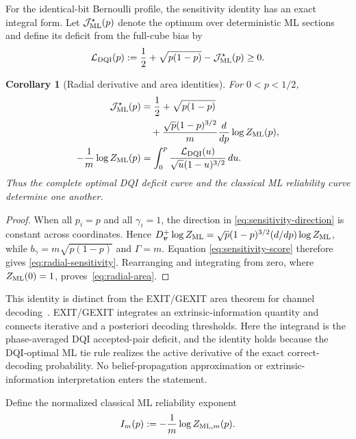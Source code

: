 \documentclass[journal]{IEEEtran}
\newtheorem{corollary}[theorem]{Corollary}
\theoremstyle{definition}
\theoremstyle{remark}
\begin{document}
For the identical-bit Bernoulli profile, the sensitivity identity has an
exact integral form.  Let $\mathcal J_{\rm ML}^{\star}(p)$ denote the optimum
over deterministic ML sections and define its deficit from the full-cube
bias by
\begin{equation}
 \mathcal L_{\rm DQI}(p)
 :=\frac12+\sqrt{p(1-p)}-\mathcal J_{\rm ML}^{\star}(p)\ge0.
 \label{eq:dqi-deficit}
\end{equation}

\begin{corollary}[Radial derivative and area identities]
\label{cor:radial-sensitivity}
For $0<p<1/2$,
\begin{align}
 \mathcal J_{\rm ML}^{\star}(p)
 &=\frac12+\sqrt{p(1-p)}
 \nonumber\\
 &\quad
 +\frac{\sqrt p(1-p)^{3/2}}{m}
   \frac{d}{dp}\log Z_{\rm ML}(p),
 \label{eq:radial-sensitivity}\\
 -\frac1m\log Z_{\rm ML}(p)
 &=\int_0^p
 \frac{\mathcal L_{\rm DQI}(u)}
 {\sqrt u(1-u)^{3/2}}\,du.
 \label{eq:radial-area}
\end{align}
Thus the complete optimal DQI deficit curve and the classical ML reliability
curve determine one another.
\end{corollary}

\begin{proof}
When all $p_i=p$ and all $\gamma_i=1$, the direction in
\eqref{eq:sensitivity-direction} is constant across coordinates.  Hence
 $D_{\boldsymbol v}^{+}\log Z_{\rm ML}
=\sqrt p(1-p)^{3/2}(d/dp)\log Z_{\rm ML}$, while
$b_\gamma=m\sqrt{p(1-p)}$ and $\Gamma=m$.  Equation
\eqref{eq:sensitivity-score} therefore gives
\eqref{eq:radial-sensitivity}.  Rearranging and integrating from zero, where
$Z_{\rm ML}(0)=1$, proves~\eqref{eq:radial-area}.
\end{proof}

This identity is distinct from the EXIT/GEXIT area theorem for channel
decoding~\cite{measson2009}.  EXIT/GEXIT integrates an extrinsic-information
quantity and connects iterative and a posteriori decoding thresholds.  Here
the integrand is the phase-averaged DQI accepted-pair deficit, and the identity
holds because the DQI-optimal ML tie rule realizes the active derivative of
the exact correct-decoding probability.  No belief-propagation approximation
or extrinsic-information interpretation enters the statement.

Define the normalized classical ML reliability exponent
\begin{equation}
 I_m(p):=-\frac1m\log Z_{{\rm ML},m}(p).
 \label{eq:normalized-reliability-exponent}
\end{equation}
\end{document}
